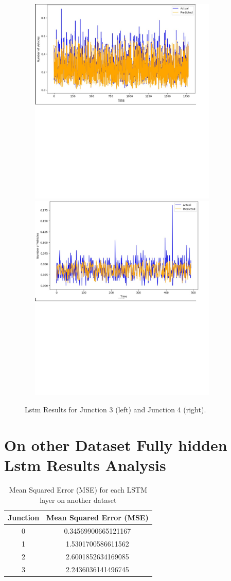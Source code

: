 \documentclass{IEEEtran}
\begin{document}
\begin{figure}[p]
    \centering
    \includegraphics[width=10cm, height=10cm]{Lstm_junc3.jpg}
    \includegraphics[width=10cm, height=10cm]{Lstm_junc4.jpg}
    \caption{Lstm Results for Junction 3 (left) and Junction 4 (right).}
    \label{fig:random_forest_junc_results}
\end{figure}

\section{On other Dataset Fully hidden Lstm Results Analysis}
\begin{table}[h]
    \centering
    \begin{tabular}{|c|c|}
        \hline
        \textbf{Junction} & \textbf{Mean Squared Error (MSE)} \\ \hline
        0 & 0.34569900665121167 \\
        1 & 1.5301700586611562 \\
        2 & 2.6001852634169085 \\
        3 & 2.2436036141496745 \\
        \hline
    \end{tabular}
    \caption{Mean Squared Error (MSE) for each LSTM layer on another dataset}
    \label{tab:lstm_mses_another_dataset}
\end{table}
\end{document}
